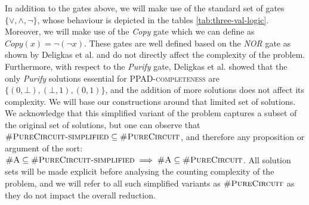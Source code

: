 In addition to the gates above, we will make use of the standard set of gates $\{\vee, \wedge, \neg\}$,
whose behaviour is depicted in the tables \ref{tab:three-val-logic}.
Moreover, we will make use of the \textit{Copy} gate which we can define as $\textit{Copy}(x) = \neg (\neg x)$.
These gates are well defined based on the \textit{NOR} gate as shown by Deligkas et al. \cite{deligkas_PureCircuitTightInapproximability_2024}
and do not directly affect the complexity of the problem.
Furthermore, with respect to the \textit{Purify} gate,
Deligkas et al. \cite{deligkas_PureCircuitTightInapproximability_2024} showed that the only \textit{Purify} solutions essential
for \textsc{PPAD-completeness} are $\{(0,\bot), (\bot,1), (0,1)\}$, and the addition of more solutions does not affect its complexity.
We will base our constructions around that limited set of solutions.
We acknowledge that this simplified variant of the problem captures a subset of the original set of solutions, but
one can observe that $\textsc{\#PureCircuit-simplified} \subseteq \textsc{\#PureCircuit}$,
and therefore any proposition or argument of the sort:
$\textsc{\#A} \subseteq \textsc{\#PureCircuit-simplified} \implies \textsc{\#A} \subseteq \textsc{\#PureCircuit}$.
All solution sets will be made explicit before analysing the counting complexity of the problem,
and we will refer to all such simplified variants as $\textsc{\#PureCircuit}$ as they do not impact
the overall reduction.

\begin{table}[h!]
	\centering
	 \quad

	\caption{Three-valued logic \cite{kleene_IntroductionMetamathematics_2009}}\label{tab:three-val-logic}
\end{table}

